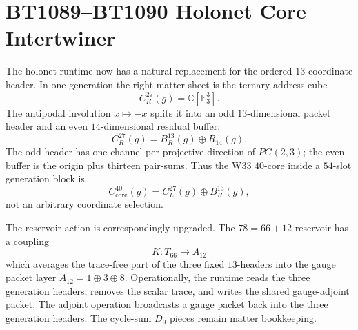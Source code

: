 \section{BT1089--BT1090 Holonet Core Intertwiner}
\label{sec:bt1089-bt1090-holonet-core-intertwiner}

The holonet runtime now has a natural replacement for the ordered $13$-coordinate header.  In one generation the right matter sheet is the ternary address cube
\[
C^{27}_R(g)=\mathbb C[\mathbb F_3^3].
\]
The antipodal involution $x\mapsto -x$ splits it into an odd $13$-dimensional packet header and an even $14$-dimensional residual buffer:
\[
C^{27}_R(g)=B^{13}_R(g)\oplus R_{14}(g).
\]
The odd header has one channel per projective direction of $PG(2,3)$; the even buffer is the origin plus thirteen pair-sums.  Thus the W33 $40$-core inside a $54$-slot generation block is
\[
C^{40}_{\mathrm{core}}(g)=C^{27}_L(g)\oplus B^{13}_R(g),
\]
not an arbitrary coordinate selection.

The reservoir action is correspondingly upgraded.  The $78=66+12$ reservoir has a coupling
\[
K:T_{66}\to A_{12}
\]
which averages the trace-free part of the three fixed $13$-headers into the gauge packet layer $A_{12}=1\oplus3\oplus8$.  Operationally, the runtime reads the three generation headers, removes the scalar trace, and writes the shared gauge-adjoint packet.  The adjoint operation broadcasts a gauge packet back into the three generation headers.  The cycle-sum $D_9$ pieces remain matter bookkeeping.
